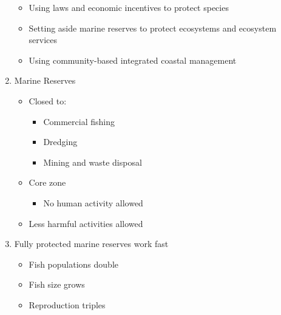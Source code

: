 \documentclass[12pt]{article}
\begin{document}
\begin{enumerate}
\begin{itemize}
      \item Using laws and economic incentives to protect species

      \item Setting aside marine reserves to protect ecosystems and ecosystem services
        
      \item Using community-based integrated coastal management

    \end{itemize}

  \item Marine Reserves

    \begin{itemize}

      \item Closed to:

        \begin{itemize}

          \item Commercial fishing

          \item Dredging

          \item Mining and waste disposal

        \end{itemize}

      \item Core zone

        \begin{itemize}

          \item No human activity allowed

        \end{itemize}

      \item Less harmful activities allowed

    \end{itemize}

  \item Fully protected marine reserves work fast

    \begin{itemize}

      \item Fish populations double

      \item Fish size grows

      \item Reproduction triples


\end{itemize}
\end{enumerate}
\end{document}
